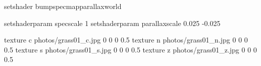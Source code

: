 setshader bumpspecmapparallaxworld

setshaderparam specscale 1
setshaderparam parallaxscale 0.025 -0.025

texture c photos/grass01_c.jpg 0 0 0 0.5
texture n photos/grass01_n.jpg 0 0 0 0.5
texture s photos/grass01_s.jpg 0 0 0 0.5
texture z photos/grass01_z.jpg 0 0 0 0.5
